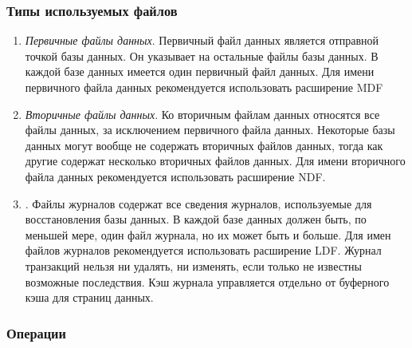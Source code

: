 \subsubsection{Типы используемых файлов}

\begin{enumerate}
	\item \textit{Первичные файлы данных}. Первичный файл данных является отправной точкой базы данных. Он указывает на 
	остальные файлы базы данных. В каждой базе данных имеется один первичный файл данных. Для имени первичного 
	файла данных рекомендуется использовать расширение MDF
	\item \textit{Вторичные файлы данных}. Ко вторичным файлам данных относятся все файлы данных, за исключением первичного 
	файла данных. Некоторые базы данных могут вообще не содержать вторичных файлов данных, тогда как другие 
	содержат несколько вторичных файлов данных. Для имени вторичного файла данных рекомендуется использовать 
	расширение NDF.
	\item {}. Файлы журналов содержат все сведения журналов, используемые для восстановления базы 
	данных. В каждой базе данных должен быть, по меньшей мере, один файл журнала, но их может быть и больше. Для 
	имен файлов журналов рекомендуется использовать расширение LDF. Журнал транзакций нельзя ни удалять, ни 
	изменять, если только не известны возможные последствия. Кэш журнала управляется отдельно от буферного кэша 
	для страниц данных.
\end{enumerate}

\subsubsection{Операции}

